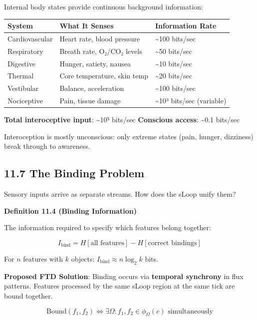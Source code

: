 \documentclass[
  11pt,
  letterpaper,
  twoside,
  openright]{book}
\begin{document}
Internal body states provide continuous background information:

\begin{longtable}[]{@{}lll@{}}
\toprule\noalign{}
System & What It Senses & Information Rate \\
\midrule\noalign{}
\endhead
\bottomrule\noalign{}
\endlastfoot
Cardiovascular & Heart rate, blood pressure & \textasciitilde100
bits/sec \\
Respiratory & Breath rate, O₂/CO₂ levels & \textasciitilde50 bits/sec \\
Digestive & Hunger, satiety, nausea & \textasciitilde10 bits/sec \\
Thermal & Core temperature, skin temp & \textasciitilde20 bits/sec \\
Vestibular & Balance, acceleration & \textasciitilde100 bits/sec \\
Nociceptive & Pain, tissue damage & \textasciitilde10³ bits/sec
(variable) \\
\end{longtable}

\textbf{Total interoceptive input}: \textasciitilde10⁵ bits/sec
\textbf{Conscious access}: \textasciitilde0.1 bits/sec

Interoception is mostly unconscious: only extreme states (pain, hunger,
dizziness) break through to awareness.

\subsection{11.7 The Binding Problem}\label{the-binding-problem}

Sensory inputs arrive as separate streams. How does the sLoop unify
them?

\textbf{Definition 11.4 (Binding Information)}

The information required to specify which features belong together:

\[I_{\text{bind}} = H[\text{all features}] - H[\text{correct bindings}]\]

For \(n\) features with \(k\) objects:
\(I_{\text{bind}} \approx n \log_2 k\) bits.

\textbf{Proposed FTD Solution}: Binding occurs via \textbf{temporal
synchrony} in flux patterns. Features processed by the same sLoop region
at the same tick are bound together.

\[\text{Bound}(f_1, f_2) \iff \exists \Omega: f_1, f_2 \in \phi_\Omega(c) \text{ simultaneously}\]
\end{document}
